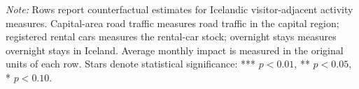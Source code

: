\begin{table}[htbp]
\centering
\caption{Additional Tourism Activity Effects of the WOW Air Bankruptcy}\label{tab:tourism_activity_impact}
\begin{minipage}{\textwidth}
\raggedright\scriptsize \textit{Note:} Rows report counterfactual estimates for Icelandic visitor-adjacent activity measures. Capital-area road traffic measures road traffic in the capital region; registered rental cars measures the rental-car stock; overnight stays measures overnight stays in Iceland. Average monthly impact is measured in the original units of each row. Stars denote statistical significance: *** $p<0.01$, ** $p<0.05$, * $p<0.10$.
\end{minipage}
\end{table}

